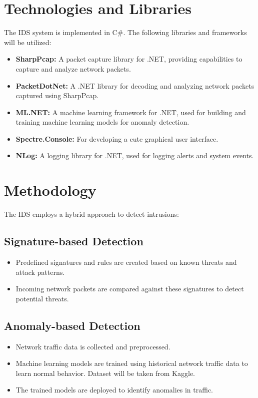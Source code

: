 \documentclass{article}
\begin{document}
\section{Technologies and Libraries}
    The IDS system is implemented in C\#. The following libraries and frameworks will be utilized:
    \begin{itemize}
        \item \textbf{SharpPcap:} A packet capture library for .NET, providing capabilities to capture and analyze network packets.
        \item \textbf{PacketDotNet:} A .NET library for decoding and analyzing network packets captured using SharpPcap.
        \item \textbf{ML.NET:} A machine learning framework for .NET, used for building and training machine learning models for anomaly detection.
        \item \textbf{Spectre.Console:} For developing a cute graphical user interface.
        \item \textbf{NLog:} A logging library for .NET, used for logging alerts and system events.
    \end{itemize}

\section{Methodology}
    The IDS employs a hybrid approach to detect intrusions:
    \subsection{Signature-based Detection}
        \begin{itemize}
            \item Predefined signatures and rules are created based on known threats and attack patterns.
            \item Incoming network packets are compared against these signatures to detect potential threats.
        \end{itemize}

    \subsection{Anomaly-based Detection}
        \begin{itemize}
            \item Network traffic data is collected and preprocessed.
            \item Machine learning models are trained using historical network traffic data to learn normal behavior. Dataset will be taken from Kaggle.
            \item The trained models are deployed to identify anomalies in traffic.
        \end{itemize}
\end{document}
